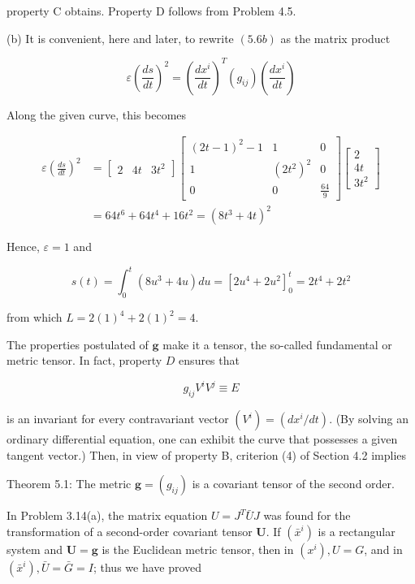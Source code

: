 \documentclass[10pt]{article}
\begin{document}
property C obtains. Property D follows from Problem 4.5.

(b) It is convenient, here and later, to rewrite $(5.6 b)$ as the matrix product


\begin{equation*}
\varepsilon\left(\frac{d s}{d t}\right)^{2}=\left(\frac{d x^{i}}{d t}\right)^{T}\left(g_{i j}\right)\left(\frac{d x^{i}}{d t}\right) \tag{5.6d}
\end{equation*}


Along the given curve, this becomes

$$
\begin{aligned}
\varepsilon\left(\frac{d s}{d t}\right)^{2} & =\left[\begin{array}{lll}
2 & 4 t & 3 t^{2}
\end{array}\right]\left[\begin{array}{ccc}
(2 t-1)^{2}-1 & 1 & 0 \\
1 & \left(2 t^{2}\right)^{2} & 0 \\
0 & 0 & \frac{64}{9}
\end{array}\right]\left[\begin{array}{c}
2 \\
4 t \\
3 t^{2}
\end{array}\right] \\
& =64 t^{6}+64 t^{4}+16 t^{2}=\left(8 t^{3}+4 t\right)^{2}
\end{aligned}
$$

Hence, $\varepsilon=1$ and

$$
s(t)=\int_{0}^{t}\left(8 u^{3}+4 u\right) d u=\left[2 u^{4}+2 u^{2}\right]_{0}^{t}=2 t^{4}+2 t^{2}
$$

from which $L=2(1)^{4}+2(1)^{2}=4$.

The properties postulated of $\mathbf{g}$ make it a tensor, the so-called fundamental or metric tensor. In fact, property $D$ ensures that

$$
g_{i j} V^{i} V^{j} \equiv E
$$

is an invariant for every contravariant vector $\left(V^{i}\right)=\left(d x^{i} / d t\right)$. (By solving an ordinary differential equation, one can exhibit the curve that possesses a given tangent vector.) Then, in view of property B, criterion (4) of Section 4.2 implies

Theorem 5.1: The metric $\mathbf{g}=\left(g_{i j}\right)$ is a covariant tensor of the second order.

In Problem 3.14(a), the matrix equation $U=J^{T} \bar{U} J$ was found for the transformation of a second-order covariant tensor $\mathbf{U}$. If $\left(\bar{x}^{i}\right)$ is a rectangular system and $\mathbf{U}=\mathbf{g}$ is the Euclidean metric tensor, then in $\left(x^{i}\right), U=G$, and in $\left(\bar{x}^{i}\right), \bar{U}=\bar{G}=I$; thus we have proved
\end{document}
